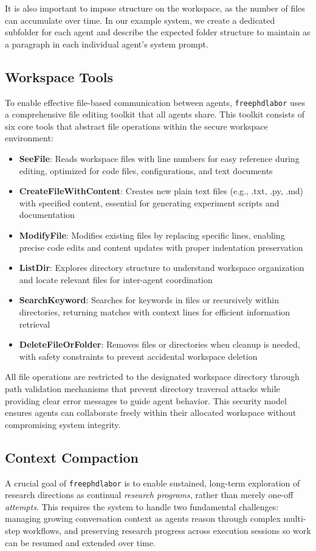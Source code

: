 \documentclass{article}
\begin{document}
It is also important to impose structure on the workspace, as the number of files can accumulate over time. In our example system, we create a dedicated subfolder for each agent and describe the expected folder structure to maintain as a paragraph in each individual agent's system prompt.

\subsection*{Workspace Tools}
To enable effective file-based communication between agents, \texttt{freephdlabor} uses a comprehensive file editing toolkit that all agents share. This toolkit consists of six core tools that abstract file operations within the secure workspace environment:

\begin{itemize}
\item \textbf{SeeFile}: Reads workspace files with line numbers for easy reference during editing, optimized for code files, configurations, and text documents
\item \textbf{CreateFileWithContent}: Creates new plain text files (e.g., .txt, .py, .md) with specified content, essential for generating experiment scripts and documentation
\item \textbf{ModifyFile}: Modifies existing files by replacing specific lines, enabling precise code edits and content updates with proper indentation preservation
\item \textbf{ListDir}: Explores directory structure to understand workspace organization and locate relevant files for inter-agent coordination
\item \textbf{SearchKeyword}: Searches for keywords in files or recursively within directories, returning matches with context lines for efficient information retrieval
\item \textbf{DeleteFileOrFolder}: Removes files or directories when cleanup is needed, with safety constraints to prevent accidental workspace deletion
\end{itemize}

All file operations are restricted to the designated workspace directory through path validation mechanisms that prevent directory traversal attacks while providing clear error messages to guide agent behavior. This security model ensures agents can collaborate freely within their allocated workspace without compromising system integrity.

\subsection*{Context Compaction}
A crucial goal of \texttt{freephdlabor} is to enable sustained, long-term exploration of research directions as continual \emph{research programs}, rather than merely one-off \emph{attempts}. This requires the system to handle two fundamental challenges: managing growing conversation context as agents reason through complex multi-step workflows, and preserving research progress across execution sessions so work can be resumed and extended over time.
\end{document}
